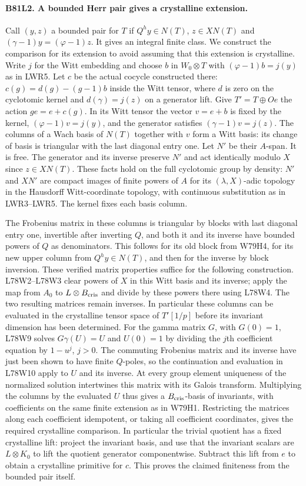 \paragraph{B81L2. A bounded Herr pair gives a crystalline extension.}
Call $(y,z)$ a bounded pair for $T$ if $Q^hy\in N(T)$,
$z\in XN(T)$ and $(\gamma-1)y=(\varphi-1)z$. It gives an integral
finite class. We construct the comparison for its extension to
avoid assuming that this extension is crystalline.
Write $j$ for the Witt embedding and choose $b$ in $W_0\otimes T$
with $(\varphi-1)b=j(y)$ as in LWR5. Let $c$ be the actual
cocycle constructed there: $c(g)=d(g)-(g-1)b$ inside the Witt
tensor, where $d$ is zero on the cyclotomic kernel and
$d(\gamma)=j(z)$ on a generator lift. Give $T'=T\oplus O e$
the action $g e=e+c(g)$. In its Witt tensor the vector $v=e+b$
is fixed by the kernel, $(\varphi-1)v=j(y)$, and the generator
satisfies $(\gamma-1)v=j(z)$. The columns of a Wach basis of
$N(T)$ together with $v$ form a Witt basis: its change of basis
is triangular with the last diagonal entry one. Let $N'$ be their
$A$-span. It is free. The generator and its inverse preserve $N'$
and act identically modulo $X$ since $z\in XN(T)$. These facts
hold on the full cyclotomic group by density: $N'$ and $XN'$ are
compact images of finite powers of $A$ for its $(\lambda,X)$-adic
topology in the Hausdorff Witt-coordinate topology, with continuous
substitution as in LWR3--LWR5. The kernel fixes each basis column.

The Frobenius matrix in these columns is triangular by blocks with
last diagonal entry one, invertible after inverting $Q$, and both
it and its inverse have bounded powers of $Q$ as denominators.
This follows for its old block from W79H4, for its new upper column
from $Q^hy\in N(T)$, and then for the inverse by block inversion.
These verified matrix properties suffice for the following construction.
L78W2--L78W3 clear powers of $X$ in this Witt basis and its inverse;
apply the map from $A_0$ to $L\otimes B_{\rm cris}$ and divide by
these powers there using L78W4. The two resulting matrices remain
inverses. In particular these columns can be evaluated in the
crystalline tensor space of $T'[1/p]$ before its invariant dimension
has been determined. For the gamma matrix $G$, with $G(0)=1$,
L78W9 solves $G\gamma(U)=U$ and $U(0)=1$ by dividing the $j$th
coefficient equation by $1-u^j$, $j>0$. The commuting Frobenius
matrix and its inverse have just been shown to have finite $Q$-poles,
so the continuation and evaluation in L78W10 apply to $U$ and its
inverse. At every group element uniqueness of the normalized solution
intertwines this matrix with its Galois transform. Multiplying the
columns by the evaluated $U$ thus gives a $B_{\rm cris}$-basis of
invariants, with coefficients on the same finite extension as in
W79H1. Restricting the matrices along each coefficient idempotent,
or taking all coefficient coordinates, gives the required crystalline
comparison. In particular the trivial quotient has a fixed crystalline
lift: project the invariant basis, and use that the invariant scalars
are $L\otimes K_0$ to lift the quotient generator componentwise.
Subtract this lift from $e$ to obtain a crystalline primitive for $c$.
This proves the claimed finiteness from the bounded pair itself.

